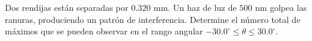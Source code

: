 \item Dos rendijas están separadas por $0.320\text{ mm}$. Un haz de luz de $500\text{ nm}$ golpea las ranuras, produciendo un patrón de interferencia. Determine el número total de máximos que se pueden observar en el rango angular $-30.0^\circ \le \theta \le 30.0^\circ$.